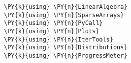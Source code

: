 \documentclass[main.tex]{subfiles}
\begin{document}
    
    \maketitle
    
    

    
    \begin{tcolorbox}[breakable, size=fbox, boxrule=1pt, pad at break*=1mm,colback=cellbackground, colframe=cellborder]
\begin{Verbatim}[commandchars=\\\{\}]
\PY{k}{using} \PY{n}{LinearAlgebra}
\PY{k}{using} \PY{n}{SparseArrays}
\PY{k}{using} \PY{n}{PyCall}
\PY{k}{using} \PY{n}{Plots}
\PY{k}{using} \PY{n}{IterTools}
\PY{k}{using} \PY{n}{Distributions}
\PY{k}{using} \PY{n}{ProgressMeter}
\end{Verbatim}
\end{tcolorbox}
\end{document}
